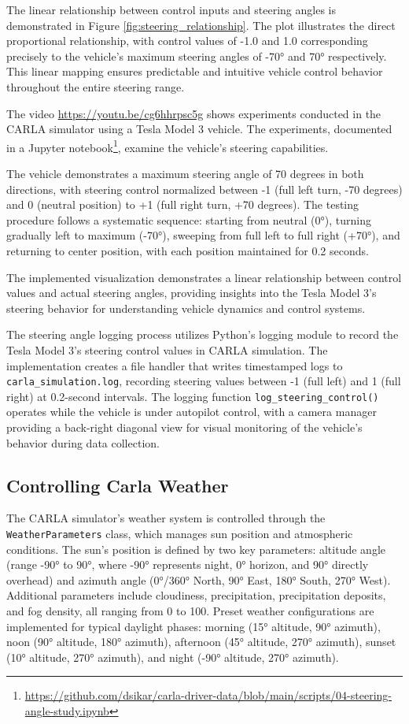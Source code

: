 The linear relationship between control inputs and steering angles is demonstrated in Figure \ref{fig:steering_relationship}. The plot illustrates the direct proportional relationship, with control values of -1.0 and 1.0 corresponding precisely to the vehicle's maximum steering angles of -70° and 70° respectively. This linear mapping ensures predictable and intuitive vehicle control behavior throughout the entire steering range.

The video \url{https://youtu.be/cg6hhrpsc5g} shows experiments conducted in the CARLA simulator using a Tesla Model 3 vehicle. The experiments, documented in a Jupyter notebook\footnote{\url{https://github.com/dsikar/carla-driver-data/blob/main/scripts/04-steering-angle-study.ipynb}}, examine the vehicle's steering capabilities.

The vehicle demonstrates a maximum steering angle of 70 degrees in both directions, with steering control normalized between -1 (full left turn, -70 degrees) and 0 (neutral position) to +1 (full right turn, +70 degrees). The testing procedure follows a systematic sequence: starting from neutral (0°), turning gradually left to maximum (-70°), sweeping from full left to full right (+70°), and returning to center position, with each position maintained for 0.2 seconds.

The implemented visualization demonstrates a linear relationship between control values and actual steering angles, providing insights into the Tesla Model 3's steering behavior for understanding vehicle dynamics and control systems.

The steering angle logging process utilizes Python's logging module to record the Tesla Model 3's steering control values in CARLA simulation. The implementation creates a file handler that writes timestamped logs to \texttt{carla\_simulation.log}, recording steering values between -1 (full left) and 1 (full right) at 0.2-second intervals. The logging function \texttt{log\_steering\_control()} operates while the vehicle is under autopilot control, with a camera manager providing a back-right diagonal view for visual monitoring of the vehicle's behavior during data collection.

\subsection{Controlling Carla Weather}
The CARLA simulator's weather system is controlled through the \texttt{WeatherParameters} class, which manages sun position and atmospheric conditions. The sun's position is defined by two key parameters: altitude angle (range -90° to 90°, where -90° represents night, 0° horizon, and 90° directly overhead) and azimuth angle (0°/360° North, 90° East, 180° South, 270° West). Additional parameters include cloudiness, precipitation, precipitation deposits, and fog density, all ranging from 0 to 100. Preset weather configurations are implemented for typical daylight phases: morning (15° altitude, 90° azimuth), noon (90° altitude, 180° azimuth), afternoon (45° altitude, 270° azimuth), sunset (10° altitude, 270° azimuth), and night (-90° altitude, 270° azimuth).

